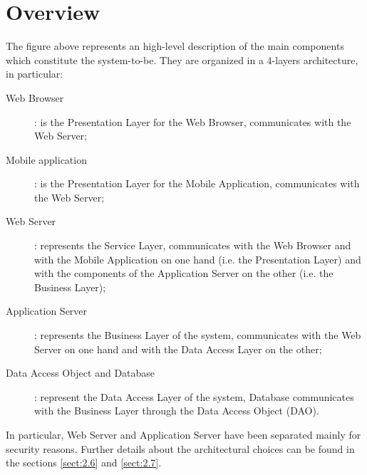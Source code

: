 \documentclass[../../DD.tex]{subfiles}
\begin{document}
\section{Overview\label{sect:2.1}}


The figure above represents an high-level description of the main components which constitute the system-to-be. They are organized in a 4-layers architecture, in particular:
\begin{description}
	\item [Web Browser]: is the Presentation Layer for the  Web Browser, communicates with the Web Server;
	\item [Mobile application]: is the Presentation Layer for the  Mobile Application, communicates with the Web Server;
	\item [Web Server]: represents the Service Layer, communicates with the  Web Browser and with the Mobile Application on one hand (i.e. the Presentation Layer) and with the components of the Application Server on the other (i.e. the Business Layer);
	\item [Application Server]: represents the Business Layer of the system, communicates with the Web Server on one hand and with the Data Access Layer on the other; 
	\item [Data Access Object and Database]: represent the Data Access Layer of the system, Database communicates with the Business Layer through the Data Access Object (DAO).
\end{description}
In particular, Web Server and Application Server have been separated mainly for security reasons.
Further details about the architectural choices can be found in the sections \ref{sect:2.6} and \ref{sect:2.7}.
\newpage
\end{document}
